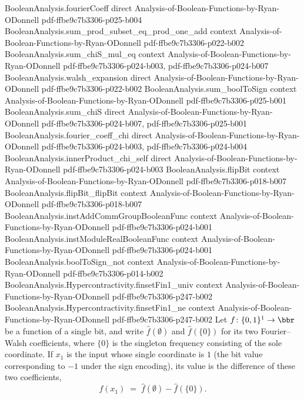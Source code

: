 \begin{lemma}
  {BooleanAnalysis.fourierCoeff}
  {direct}
  {Analysis-of-Boolean-Functions-by-Ryan-ODonnell}
  {pdf-ffbe9c7b3306-p025-b004}
\proofstep
  {BooleanAnalysis.sum_prod_subset_eq_prod_one_add}
  {context}
  {Analysis-of-Boolean-Functions-by-Ryan-ODonnell}
  {pdf-ffbe9c7b3306-p022-b002}
\proofstep
  {BooleanAnalysis.sum_chiS_mul_eq}
  {context}
  {Analysis-of-Boolean-Functions-by-Ryan-ODonnell}
  {pdf-ffbe9c7b3306-p024-b003,
    pdf-ffbe9c7b3306-p024-b007}
\proofstep
  {BooleanAnalysis.walsh_expansion}
  {direct}
  {Analysis-of-Boolean-Functions-by-Ryan-ODonnell}
  {pdf-ffbe9c7b3306-p022-b002}
\proofstep
  {BooleanAnalysis.sum_boolToSign}
  {context}
  {Analysis-of-Boolean-Functions-by-Ryan-ODonnell}
  {pdf-ffbe9c7b3306-p025-b001}
\proofstep
  {BooleanAnalysis.sum_chiS}
  {direct}
  {Analysis-of-Boolean-Functions-by-Ryan-ODonnell}
  {pdf-ffbe9c7b3306-p024-b007,
    pdf-ffbe9c7b3306-p025-b001}
\proofstep
  {BooleanAnalysis.fourier_coeff_chi}
  {direct}
  {Analysis-of-Boolean-Functions-by-Ryan-ODonnell}
  {pdf-ffbe9c7b3306-p024-b003,
    pdf-ffbe9c7b3306-p024-b004}
\proofstep
  {BooleanAnalysis.innerProduct_chi_self}
  {direct}
  {Analysis-of-Boolean-Functions-by-Ryan-ODonnell}
  {pdf-ffbe9c7b3306-p024-b003}
\proofstep
  {BooleanAnalysis.flipBit}
  {context}
  {Analysis-of-Boolean-Functions-by-Ryan-ODonnell}
  {pdf-ffbe9c7b3306-p018-b007}
\proofstep
  {BooleanAnalysis.flipBit_flipBit}
  {context}
  {Analysis-of-Boolean-Functions-by-Ryan-ODonnell}
  {pdf-ffbe9c7b3306-p018-b007}
\proofstep
  {BooleanAnalysis.instAddCommGroupBooleanFunc}
  {context}
  {Analysis-of-Boolean-Functions-by-Ryan-ODonnell}
  {pdf-ffbe9c7b3306-p024-b001}
\proofstep
  {BooleanAnalysis.instModuleRealBooleanFunc}
  {context}
  {Analysis-of-Boolean-Functions-by-Ryan-ODonnell}
  {pdf-ffbe9c7b3306-p024-b001}
\proofstep
  {BooleanAnalysis.boolToSign_not}
  {context}
  {Analysis-of-Boolean-Functions-by-Ryan-ODonnell}
  {pdf-ffbe9c7b3306-p014-b002}
\proofstep
  {BooleanAnalysis.Hypercontractivity.finsetFin1_univ}
  {context}
  {Analysis-of-Boolean-Functions-by-Ryan-ODonnell}
  {pdf-ffbe9c7b3306-p247-b002}
\proofstep
  {BooleanAnalysis.Hypercontractivity.finsetFin1_ne}
  {context}
  {Analysis-of-Boolean-Functions-by-Ryan-ODonnell}
  {pdf-ffbe9c7b3306-p247-b002}
\label{BooleanAnalysis.Hypercontractivity.one_bit_val_true}
Let $f\colon\{0,1\}^1\to\bbr$ be a function of a single bit, and write $\hat
f(\emptyset)$ and $\hat f(\{0\})$ for its two Fourier--Walsh coefficients, where $\{0\}$
is the singleton frequency consisting of the sole coordinate. If $x_1$ is the input
whose single coordinate is $1$ (the bit value corresponding to $-1$ under the sign
encoding), its value is the difference of these two coefficients,
\[
  f(x_1) \;=\; \hat f(\emptyset) - \hat f(\{0\}).
\]
\end{lemma}

